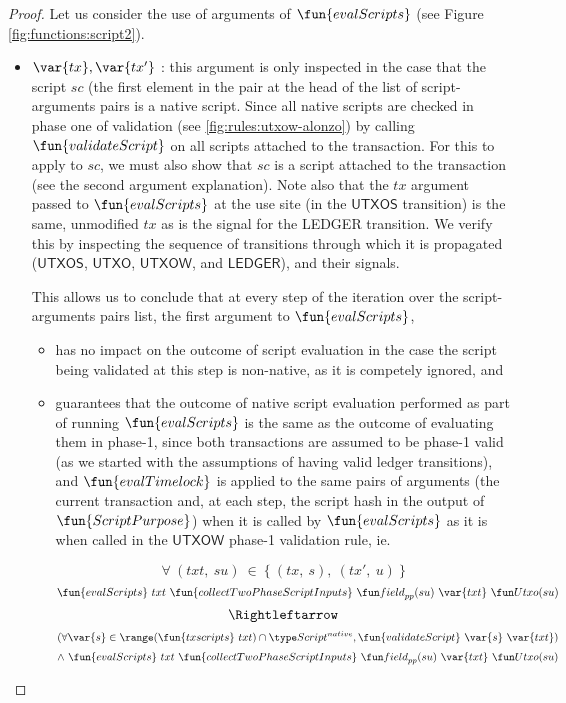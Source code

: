 \begin{property}
\begin{corollary}
\end{corollary}
\begin{proof}
  Let us consider the use of arguments of $\fun{evalScripts}$ (see Figure \ref{fig:functions:script2}).
  \begin{itemize}
    \item $\var{tx}, \var{tx'}$ : this argument is only inspected in the case that the script $sc$ (the first element
    in the pair at the head of the list of script-arguments pairs is a native script. Since all native scripts
    are checked in phase one of validation (see \ref{fig:rules:utxow-alonzo}) by calling $\fun{validateScript}$
    on all scripts attached to the transaction. For this to apply to $sc$, we must also show
    that $sc$ is a script attached to the transaction (see the second argument explanation).
    Note also that the $tx$ argument passed to $\fun{evalScripts}$ at the use site (in the $\mathsf{UTXOS}$ transition)
    is the same, unmodified $tx$ as is the signal for the LEDGER transition. We verify this by inspecting
    the sequence of transitions through which it is propagated
    ($\mathsf{UTXOS}$, $\mathsf{UTXO}$, $\mathsf{UTXOW}$, and $\mathsf{LEDGER}$), and their signals.

    This allows us to conclude that at every step of the iteration over the script-arguments pairs list,
    the first argument to $\fun{evalScripts}$,

    \begin{itemize}
      \item has no impact on the outcome of script evaluation in the case the script
      being validated at this step is non-native, as it is competely ignored, and

      \item guarantees that the outcome of native script evaluation performed
      as part of running $\fun{evalScripts}$ is the
      same as the outcome of evaluating them in phase-1, since both transactions
      are assumed to be phase-1 valid (as we started
      with the assumptions of having valid ledger transitions), and
      $\fun{evalTimelock}$ is applied to the same pairs of arguments (the current transaction
      and, at each step, the script hash in the output of $\fun{ScriptPurpose}$)
      when it is called by $\fun{evalScripts}$ as it is when called in the $\mathsf{UTXOW}$
      phase-1 validation rule, ie.

      \[ \forall ~(txt,~ su)~ \in~ \{~(tx,~ s),~(tx',~ u)~\} \]
      \[\fun{evalScripts}~{txt}~ \fun{collectTwoPhaseScriptInputs} ~\field_{pp}(su)~\var{txt}~ \Utxo(su) \]
      \[~ \Rightleftarrow ~ \]
      \[(\forall \var{s} \in \range (\fun{txscripts}~{txt}) \cap \ScriptNative,
      \fun{validateScript}~\var{s}~\var{txt}) \]
      \[ \wedge ~\fun{evalScripts}~{txt}~ \fun{collectTwoPhaseScriptInputs} ~\field_{pp}(su)~\var{txt}~ \Utxo(su) \]


\end{itemize}
\end{itemize}
\end{proof}
\end{property}
